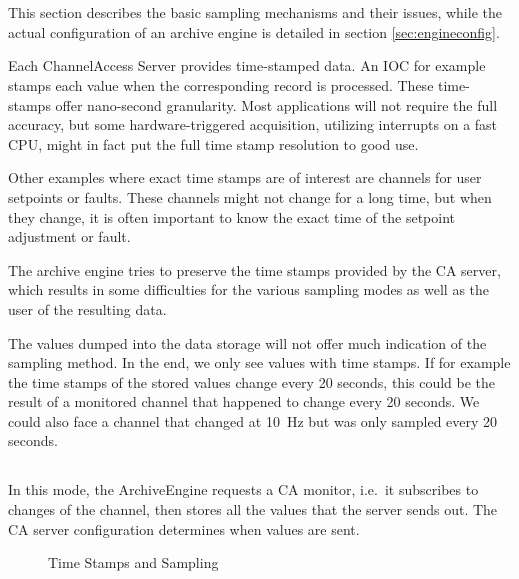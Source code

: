 \section{} \label{sec:sampling} %
This section describes the basic sampling mechanisms and their issues,
while the actual configuration of an archive engine is detailed in section
\ref{sec:engineconfig}.

Each ChannelAccess Server provides time-stamped data. An IOC for
example stamps each value when the corresponding record is
processed.  These time-stamps offer nano-second granularity. Most
applications will not require the full accuracy, but some
hardware-triggered acquisition, utilizing interrupts on a fast CPU,
might in fact put the full time stamp resolution to good use.

Other examples where exact time stamps are of interest are channels
for user setpoints or faults. These channels might not change for a
long time, but when they change, it is often important to know the
exact time of the setpoint adjustment or fault.

The archive engine tries to preserve the time stamps provided by
the CA server, which results in some difficulties for the various
sampling modes as well as the user of the resulting data.

\NOTE The values dumped into the data storage will not offer much
indication of the sampling method. In the end, we only see values with
time stamps. If for example the time stamps of the stored values
change every 20 seconds, this could be the result of a monitored
channel that happened to change every 20 seconds. We could also face a
channel that changed at 10~Hz but was only sampled every 20 seconds. 

\subsection{}
In this mode, the ArchiveEngine requests a CA monitor, i.e.\ it
subscribes to changes of the channel, then stores all the values that the server
sends out. The CA server configuration determines when values are sent.

\medskip

\begin{figure}[htb]
\begin{center}
\end{center}
\caption{\label{fig:times}Time Stamps and Sampling}
\end{figure}

